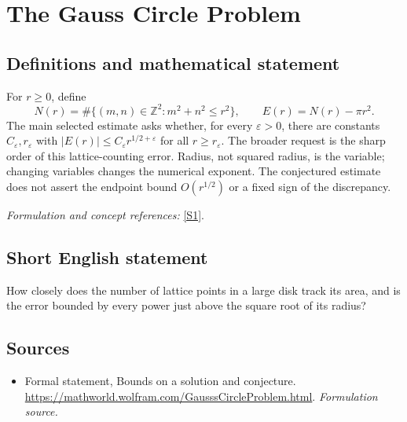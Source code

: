 \documentclass[11pt]{article}
\begin{document}
\section*{\texorpdfstring{The Gauss Circle Problem}{The Gauss Circle Problem}}\label{statement}
\subsection{Definitions and mathematical statement}
For $r\ge0$, define
\[
 N(r)=\#\{(m,n)\in{\mathbb{Z}}^2:m^2+n^2\le r^2\},\qquad E(r)=N(r)-\pi r^2.
\]
The main selected estimate asks whether, for every ${\varepsilon}>0$, there are constants $C_{\varepsilon},r_{\varepsilon}$ with
$|E(r)|\le C_{\varepsilon} r^{1/2+{\varepsilon}}$ for all $r\ge r_{\varepsilon}$.
The broader request is the sharp order of this lattice-counting error. Radius, not squared radius, is the variable; changing variables changes the numerical exponent. The conjectured estimate does not assert the endpoint bound $O(r^{1/2})$ or a fixed sign of the discrepancy.
\par\smallskip\textit{Formulation and concept references:} \href{https://mathworld.wolfram.com/GausssCircleProblem.html}{[S1]}.

\subsection{Short English statement}
How closely does the number of lattice points in a large disk track its area, and is the error bounded by every power just above the square root of its radius?
\subsection{Sources}
\begin{itemize}
\item[S1]Formal statement, Bounds on a solution and conjecture.
\url{https://mathworld.wolfram.com/GausssCircleProblem.html}.
\textit{Formulation source.}
\end{itemize}
\end{document}
